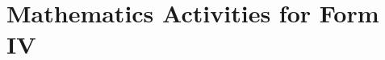 \documentclass[pdftex,10pt,a4paper,twoside]{report}
\begin{document}
\chapter{Mathematics Activities for Form IV}
%
%
%
%
%
%
%
%






\end{document}
